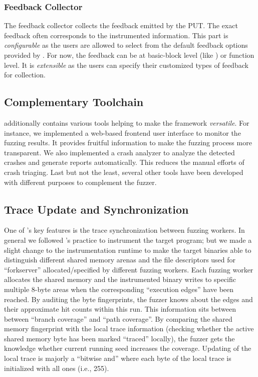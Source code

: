 \subsubsection{Feedback Collector}
The feedback collector collects the feedback emitted by the PUT.
The exact feedback often corresponds to the instrumented information.
This part is \textit{configurable} as the users are allowed to select from the default feedback options provided by {\FOT}.
For now, the feedback can be at basic-block level (like {\AFL}) or function level.
It is \textit{extensible} as the users can specify their customized types of feedback for collection.

\subsection{Complementary Toolchain}
{\FOT} additionally contains various tools helping to make the framework \textit{versatile}.
For instance, we implemented a web-based frontend user interface to monitor the fuzzing results.
It provides fruitful information to make the fuzzing process more transparent.
We also implemented a crash analyzer to analyze the detected crashes and generate reports automatically.
This reduces the manual efforts of crash triaging.
Last but not the least, several other tools have been developed with different purposes to complement the fuzzer.


\subsection{Trace Update and Synchronization}\label{sec:trace_sync}
One of {\FOT}'s key features is the trace synchronization between fuzzing workers. In general we followed {\AFL}'s practice to instrument the target program; but we made a slight change to the instrumentation runtime to make the target binaries able to distinguish different shared memory arenas and the file descriptors used for ``forkserver'' allocated/specified by different fuzzing workers. Each fuzzing worker allocates the shared memory and the instrumented binary writes to specific multiple 8-byte areas when the corresponding ``execution edges'' have been reached. By auditing the byte fingerprints, the fuzzer knows about the edges and their approximate hit counts within this run. This information sits between between ``branch coverage'' and ``path coverage''. By comparing the shared memory fingerprint with the local trace information (checking whether the active shared memory byte has been marked ``traced'' locally), the fuzzer gets the knowledge whether current running seed increases the coverage. Updating of the local trace is majorly a ``bitwise and'' where each byte of the local trace is initialized with all ones (i.e., 255).

